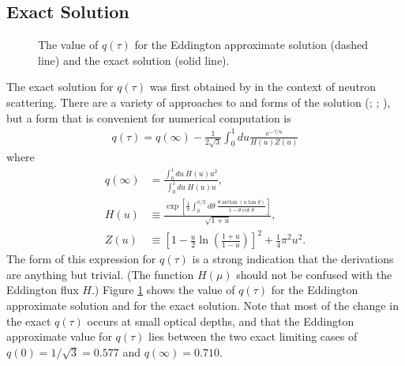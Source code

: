 \newslide

\subsection{Exact Solution}

\begin{figure}
\footnotesize
{}
\caption{The value of $q(\tau)$ for the Eddington
approximate solution (dashed line) and the exact solution
(solid line).}
\label{figure-grey-q}
\end{figure}

The exact solution for $q(\tau)$ was first obtained by \cite{Mark-1947}
in the context of neutron scattering. There are a variety of approaches
to and forms of the solution
(\citealt[ch.\ 4 and 5]{Chandrasekhar-1960}; \citealt[\S27, \S28, and
\S29]{Kourganoff-1952}; \citealt[ch.\ 3]{Woolley-1953}), but a form that is
convenient for numerical computation is
\begin{align}
q(\tau) = q(\infty) - \frac{1}{2 \sqrt 3} \int_0^1\!\!\!du
\frac{e^{-\tau/u}}{H(u) Z(u)}
\end{align}
where
\begin{align}
q(\infty) &=
\frac{\int_0^1\!du\:H(u)u^2}{\int_0^1\!du\:H(u)u},\\
H(u) &\equiv
\frac{\exp
\left[\frac{1}{\pi}
\int_0^{\pi/2}\!\!\!d\theta\:
\frac{\theta\arctan (u \tan\theta)}{1 - \theta \cot\theta}
\right]}
{\sqrt{1 + u}},\\
Z(u) &\equiv \left[1 - \frac{u}{2}\ln \left(\frac{1 + u}{1
- u}\right)\right]^2 + \frac{1}{4} \pi^2 u^2.
\end{align}
The form of this expression for $q(\tau)$ is a strong indication that
the derivations are anything but trivial. (The function $H(\mu)$ should
not be confused with the Eddington flux $H$.) Figure
\ref{figure-grey-q} shows
the value of $q(\tau)$ for the Eddington approximate
solution and for the exact solution. Note that most of the
change in the exact $q(\tau)$ occurs at small optical
depths, and that the Eddington approximate value for
$q(\tau)$ lies between the two exact limiting cases of $q(0)
= 1/\sqrt{3} = 0.577$ and $q(\infty) = 0.710$.

